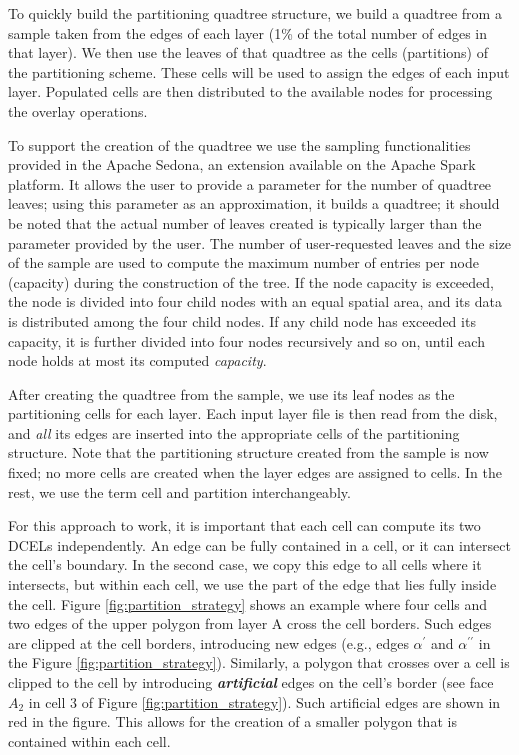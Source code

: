 To quickly build the partitioning quadtree structure, we build a quadtree from a sample taken from the edges of each layer (1\% of the total number of edges in that layer). We then use the leaves of that quadtree as the cells (partitions) of the partitioning scheme. These cells will be used to assign the edges of each input layer. Populated cells are then distributed to the available nodes for processing the overlay operations.

To support the creation of the quadtree we use the sampling functionalities provided in the Apache Sedona, an extension available on the Apache Spark platform. It allows the user to provide a parameter for the number of quadtree leaves; using this parameter as an approximation, it builds a quadtree; it should be noted that the actual number of leaves created is typically larger than the parameter provided by the user. The number of user-requested leaves and the size of the sample are used to compute the maximum number of entries per node (capacity) during the construction of the tree.  If the node capacity is exceeded, the node is divided into four child nodes with an equal spatial area, and its data is distributed among the four child nodes.  If any child node has exceeded its capacity, it is further divided into four nodes recursively and so on, until each node holds at most its computed \textit{capacity}.

After creating the quadtree from the sample, we use its leaf nodes as the partitioning cells for each layer. Each input layer file is then read from the disk, and \textit{all} its edges are inserted into the appropriate cells of the partitioning structure. Note that the partitioning structure created from the sample is now fixed; no more cells are created when the layer edges are assigned to cells. In the rest, we use the term cell and partition interchangeably.

For this approach to work, it is important that each cell can compute its two DCELs independently. An edge can be fully contained in a cell, or it can intersect  the cell's boundary. In the second case, we copy this edge to all cells where it intersects, but within each cell, we use the part of the edge that lies fully inside the cell. Figure \ref{fig:partition_strategy} shows an example where four cells and two edges of the upper polygon from layer A cross the cell borders.  Such edges are clipped at the cell borders, introducing new edges (e.g., edges $\alpha^{\prime}$ and $\alpha^{\prime \prime}$ in the Figure \ref{fig:partition_strategy}). Similarly, a polygon that crosses over a cell is clipped to the cell by introducing \textit{\textbf{artificial}} edges on the cell's border (see face $A_2$ in cell 3 of Figure \ref{fig:partition_strategy}). Such artificial edges are shown in red in the figure. This allows for the creation of a smaller polygon that is contained within each cell.

